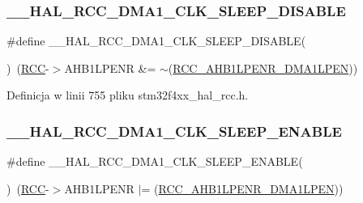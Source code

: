 \subsubsection{\texorpdfstring{\+\_\+\+\_\+\+H\+A\+L\+\_\+\+R\+C\+C\+\_\+\+D\+M\+A1\+\_\+\+C\+L\+K\+\_\+\+S\+L\+E\+E\+P\+\_\+\+D\+I\+S\+A\+B\+LE}{\_\_HAL\_RCC\_DMA1\_CLK\_SLEEP\_DISABLE}}
{\footnotesize\ttfamily \#define \+\_\+\+\_\+\+H\+A\+L\+\_\+\+R\+C\+C\+\_\+\+D\+M\+A1\+\_\+\+C\+L\+K\+\_\+\+S\+L\+E\+E\+P\+\_\+\+D\+I\+S\+A\+B\+LE(\begin{DoxyParamCaption}{ }\end{DoxyParamCaption})~(\hyperlink{group___peripheral__declaration_ga74944438a086975793d26ae48d5882d4}{R\+CC}-\/$>$A\+H\+B1\+L\+P\+E\+NR \&= $\sim$(\hyperlink{group___peripheral___registers___bits___definition_ga7d6c8ae1441d545d18c54b30c6a0da77}{R\+C\+C\+\_\+\+A\+H\+B1\+L\+P\+E\+N\+R\+\_\+\+D\+M\+A1\+L\+P\+EN}))}



Definicja w linii 755 pliku stm32f4xx\+\_\+hal\+\_\+rcc.\+h.

\mbox{\label{group___r_c_c___a_h_b1___low_power___enable___disable_ga568e4d004285fe009bc4e5d33e13af61}} 
\subsubsection{\texorpdfstring{\+\_\+\+\_\+\+H\+A\+L\+\_\+\+R\+C\+C\+\_\+\+D\+M\+A1\+\_\+\+C\+L\+K\+\_\+\+S\+L\+E\+E\+P\+\_\+\+E\+N\+A\+B\+LE}{\_\_HAL\_RCC\_DMA1\_CLK\_SLEEP\_ENABLE}}
{\footnotesize\ttfamily \#define \+\_\+\+\_\+\+H\+A\+L\+\_\+\+R\+C\+C\+\_\+\+D\+M\+A1\+\_\+\+C\+L\+K\+\_\+\+S\+L\+E\+E\+P\+\_\+\+E\+N\+A\+B\+LE(\begin{DoxyParamCaption}{ }\end{DoxyParamCaption})~(\hyperlink{group___peripheral__declaration_ga74944438a086975793d26ae48d5882d4}{R\+CC}-\/$>$A\+H\+B1\+L\+P\+E\+NR $\vert$= (\hyperlink{group___peripheral___registers___bits___definition_ga7d6c8ae1441d545d18c54b30c6a0da77}{R\+C\+C\+\_\+\+A\+H\+B1\+L\+P\+E\+N\+R\+\_\+\+D\+M\+A1\+L\+P\+EN}))}



